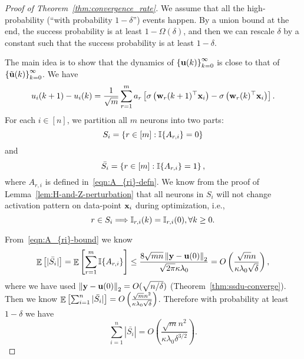 \begin{proof}[Proof of Theorem~\ref{thm:convergence_rate}]
	We assume that all the high-probability (``with probability $1-\delta$'') events happen. By a union bound at the end, the success probability is at least $1-\Omega(\delta)$, and then we can rescale $\delta$ by a constant such that the success probability is at least $1-\delta$.
	
	The main idea is to show that the dynamics of $\left\{\mathbf{u}(k) \right\}_{k=0}^\infty$ is close to that of $\left\{\tilde{\mathbf{u}}(k) \right\}_{k=0}^\infty$.
	We have
	\begin{equation} \label{eqn:u-dynamics-1}
	u_i(k+1) - u_i(k) = \frac{1}{\sqrt m} \sum_{r=1}^m a_r \left[ \sigma\left( \mathbf{w}_r(k+1)^\top \mathbf{x}_i \right)  -  \sigma\left( \mathbf{w}_r(k)^\top \mathbf{x}_i \right) \right].
	\end{equation}
	For each $i\in[n]$, we partition all $m$ neurons into two parts:
	\[
	S_i = \left\{ r\in[m] : \mathbb{I}\{A_{r, i}\} = 0  \right\}
	\]
	and
	\[
	\bar{S_i} = \left\{ r\in[m] : \mathbb{I}\{A_{r, i}\} = 1 \right\},
	\]
	where $A_{r, i}$ is defined in~\eqref{eqn:A_{ri}-defn}.
	We know from the proof of Lemma~\ref{lem:H-and-Z-perturbation} that all neurons in $S_i$ will not change activation pattern on data-point $\mathbf{x}_i$ during optimization, i.e.,
	\[
	r\in S_i \Longrightarrow \mathbb{I}_{r, i}(k) = \mathbb{I}_{r, i}(0), \forall k\ge0.
	\]
	
	From~\eqref{eqn:A_{ri}-bound} we know
	\begin{align*}
	\mathop\mathbb{E}\left[ |\bar{S_i}| \right] = \mathop\mathbb{E}\left[ \sum_{r=1}^m \mathbb{I}\{A_{r, i}\} \right]
	\le  \frac{8\sqrt{mn} \left\|\mathbf{y}- \mathbf{u}(0)\right\|_2}{\sqrt{2\pi}\kappa \lambda_0}
	= O\left( \frac{\sqrt{m} n }{\kappa \lambda_0 \sqrt\delta} \right),
	\end{align*}
	where we have used $\left\|\mathbf{y} - \mathbf{u}(0)\right\|_2 = O(\sqrt{n/\delta})$ (Theorem~\ref{thm:ssdu-converge}).
	Then we know $\mathop\mathbb{E}\left[ \sum_{i=1}^n |\bar{S_i}| \right]  = O\left( \frac{\sqrt{m} n^2 }{\kappa \lambda_0 \sqrt\delta} \right)$. Therefore with probability at least $1-\delta$ we have
	\begin{equation} \label{eqn:S_i_bar-bound}
	\sum_{i=1}^n |\bar{S_i}| = O\left( \frac{\sqrt{m} n^2 }{\kappa \lambda_0 \delta^{3/2}} \right).
	\end{equation}
	

\end{proof}
